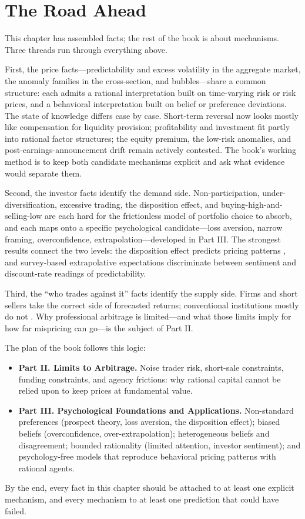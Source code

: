 \section{The Road Ahead}
\label{sec:ahead}

This chapter has assembled facts; the rest of the book is about mechanisms. Three threads run through everything above.

First, the price facts---predictability and excess volatility in the aggregate market, the anomaly families in the cross-section, and bubbles---share a common structure: each admits a rational interpretation built on time-varying risk or risk prices, and a behavioral interpretation built on belief or preference deviations. The state of knowledge differs case by case. Short-term reversal now looks mostly like compensation for liquidity provision; profitability and investment fit partly into rational factor structures; the equity premium, the low-risk anomalies, and post-earnings-announcement drift remain actively contested. The book's working method is to keep both candidate mechanisms explicit and ask what evidence would separate them.

Second, the investor facts identify the demand side. Non-participation, under-diversification, excessive trading, the disposition effect, and buying-high-and-selling-low are each hard for the frictionless model of portfolio choice to absorb, and each maps onto a specific psychological candidate---loss aversion, narrow framing, overconfidence, extrapolation---developed in Part III. The strongest results connect the two levels: the disposition effect predicts pricing patterns \citep{frazzini2006}, and survey-based extrapolative expectations discriminate between sentiment and discount-rate readings of predictability.

Third, the ``who trades against it'' facts identify the supply side. Firms and short sellers take the correct side of forecasted returns; conventional institutions mostly do not \citep{lewellen2011,edelen2016,mclean2025}. Why professional arbitrage is limited---and what those limits imply for how far mispricing can go---is the subject of Part II.

The plan of the book follows this logic:
\begin{itemize}
  \item \textbf{Part II. Limits to Arbitrage.} Noise trader risk, short-sale constraints, funding constraints, and agency frictions: why rational capital cannot be relied upon to keep prices at fundamental value.
  \item \textbf{Part III. Psychological Foundations and Applications.} Non-standard preferences (prospect theory, loss aversion, the disposition effect); biased beliefs (overconfidence, over-extrapolation); heterogeneous beliefs and disagreement; bounded rationality (limited attention, investor sentiment); and psychology-free models that reproduce behavioral pricing patterns with rational agents.
\end{itemize}
By the end, every fact in this chapter should be attached to at least one explicit mechanism, and every mechanism to at least one prediction that could have failed.
